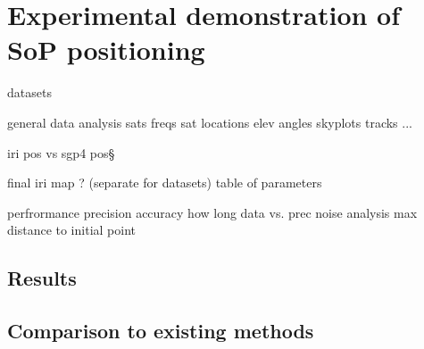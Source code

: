 \chapter{Experimental demonstration of SoP positioning}
datasets

general data analysis
    sats
    freqs
    sat locations
    elev angles
    skyplots
    tracks
    ...

iri pos vs sgp4 pos§


final iri map ? (separate for datasets)
table of parameters

perfrormance
    precision
    accuracy
    how long data vs. prec
    noise analysis
    max distance to  initial point


\section{Results}

\section{Comparison to existing methods}
